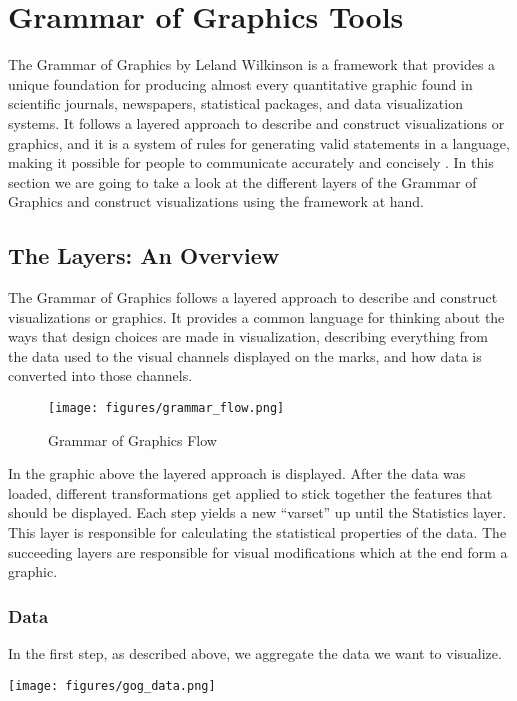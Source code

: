 \chapter{Grammar of Graphics Tools}
The Grammar of Graphics by Leland Wilkinson is a framework that provides a unique foundation for producing almost every quantitative graphic found in scientific journals, newspapers, statistical packages, and data visualization systems.
It follows a layered approach to describe and construct visualizations or graphics, and it is a system of rules for generating valid statements in a language, making it possible for people to communicate accurately and concisely \cite{GrammarGraphics2005}.
In this section we are going to take a look at the different layers of the Grammar of Graphics and construct visualizations using the framework at hand.

\section*{The Layers: An Overview}
The Grammar of Graphics follows a layered approach to describe and construct visualizations or graphics. It provides a common language for thinking about the ways that design choices are made in visualization, describing everything from the data used to the visual channels displayed on the marks, and how data is converted into those channels.
\begin{figure}[h]
    \centering
    \texttt{[image: figures/grammar\_flow.png]}
    \caption{Grammar of Graphics Flow \cite{wilkinsonHowMakePie2005}}
\end{figure}

In the graphic above the layered approach is displayed. After the data was loaded, different transformations 
get applied to stick together the features that should be displayed. Each step yields a new ``varset'' up until
the Statistics layer. This layer is responsible for calculating the statistical properties of the data. The succeeding
layers are responsible for visual modifications which at the end form a graphic.

\captionsetup{justification=centering}

\subsection*{Data}
\begin{minipage}[t]{0.6\textwidth}
    \vspace{0pt}
    In the first step, as described above, we aggregate the data we want to visualize.
    \hspace{1cm}
\end{minipage}%
\begin{minipage}[t]{0.4\textwidth}
    \vspace{0pt}
    \texttt{[image: figures/gog\_data.png]}
\end{minipage}

